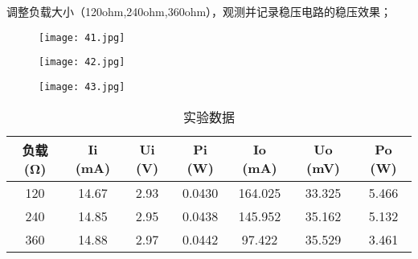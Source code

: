 \documentclass[dvipsnames, svgnames,a4paper,11pt]{article}
\begin{document}
调整负载大小（120ohm,240ohm,360ohm），观测并记录稳压电路的稳压效果；
\begin{figure}[H]
	\begin{minipage}[b]{0.3\linewidth}
	  \centering
	  \texttt{[image: 41.jpg]}
	
	\end{minipage}
	\hfill
	\begin{minipage}[b]{0.3\linewidth}
	  \centering
	  \texttt{[image: 42.jpg]}
	
	\end{minipage}
	\hfill
	\begin{minipage}[b]{0.3\linewidth}
	  \centering
	  \texttt{[image: 43.jpg]}
	  
	\end{minipage}
\end{figure}
\begin{table}[H]
    \centering
    \caption{实验数据}
    \begin{tabular}{|c|c|c|c|c|c|c|}
        \hline
        负载 (Ω) & Ii (mA) & Ui (V) & Pi (W) & Io (mA) & Uo (mV) & Po (W) \\
        \hline
        120 & 14.67 & 2.93 & 0.0430 & 164.025 & 33.325 & 5.466 \\
        \hline
        240 & 14.85 & 2.95 & 0.0438 & 145.952 & 35.162 & 5.132 \\
        \hline
        360 & 14.88 & 2.97 & 0.0442 & 97.422 & 35.529 & 3.461 \\
        \hline
    \end{tabular}
\end{table}
\end{document}
